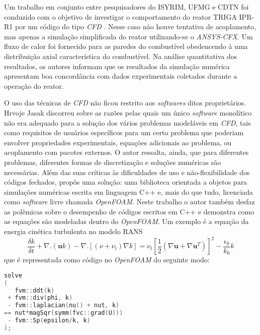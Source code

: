 Um trabalho em conjunto entre pesquisadores do ISYRIM, UFMG e CDTN foi conduzido
com o objetivo de investigar o comportamento do reator TRIGA IPR-R1 por um código do tipo \textit{CFD} \cite{Martinez2012}. 
Nesse caso não houve tentativa de acoplamento, mas apenas a simulação simplificada 
do reator utilizando-se o \textit{ANSYS-CFX}. Um fluxo de calor 
foi fornecido para as paredes do combustível obedencendo à uma distribuição axial 
característica do combustível. Na análise quantitativa dos resultados, os autores 
informam que os resultados da simulação numérica apresentam boa concordância com 
dados experimentais coletados durante a operação do reator.

O uso das técnicas de \textit{CFD} não ficou restrito aos \textit{softwares} ditos proprietários.
Hrvoje Jasak discorreu sobre as razões pelas quais um único \textit{software} monolítico
não era adequado para a solução dos vários problemas modeláveis em \textit{CFD}, tais como requisitos
de usuários específicos para um certo problema que poderiam envolver propriedades
experimentais, equações adicionais ao problema, ou acoplamento com pacotes externos.
O autor ressalta, ainda, que para diferentes problemas, diferentes formas de discretização
e soluções numéricas são necessárias. Além das suas críticas às dificuldades de uso e
não-flexibilidade dos códigos fechados, propôs uma solução: uma biblioteca
orientada a objetos para simulações numéricas escrita em linguagem C++ e, mais do que tudo,
licenciada como \textit{software} livre \cite{Jasak2007} chamada \textit{OpenFOAM}.
Neste trabalho o autor também desfaz as polêmicas sobre o desempenho de códigos escritos
em C++ e demonstra como as equações são modeladas dentro do \textit{OpenFOAM}. Um
exemplo é a equação da energia cinética turbulenta no modelo RANS
\begin{equation}
  \frac{\delta k}{\delta t} + \nabla . (\mathbf{u}k) - \nabla . [(\nu + \nu_{t})
    \nabla k] = \nu_t \left[ \frac{1}{2}(\nabla \mathbf{u} + \nabla \mathbf{u}^T)\right]^2 - \frac{\epsilon_0}{k_0}k
\end{equation}
que é representada como código no \textit{OpenFOAM} do seguinte modo:
\begin{lstlisting}[language=c++]
solve
(
   fvm::ddt(k)
 + fvm::div(phi, k)
 - fvm::laplacian(nu() + nut, k)
== nut*magSqr(symm(fvc::grad(U)))
 - fvm::Sp(epsilon/k, k)
);  
\end{lstlisting}


